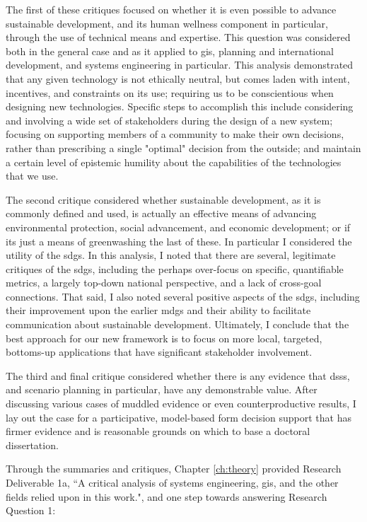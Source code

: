 The first of these critiques focused on whether it is even possible to advance sustainable development, and its human wellness component in particular, through the use of technical means and expertise. This question was considered both in the general case and as it applied to \ac{gis}, planning and international development, and systems engineering in particular. This analysis demonstrated that any given technology is not ethically neutral, but comes laden with intent, incentives, and constraints on its use; requiring us to be conscientious when designing new technologies. Specific steps to accomplish this include considering and involving a wide set of stakeholders during the design of a new system; focusing on supporting members of a community to make their own decisions, rather than prescribing a single "optimal" decision from the outside; and maintain a certain level of epistemic humility about the capabilities of the technologies that we use.

The second critique considered whether sustainable development, as it is commonly defined and used, is actually an effective means of advancing environmental protection, social advancement, and economic development; or if its just a means of greenwashing the last of these. In particular I considered the utility of the \acfp{sdg}. In this analysis, I noted that there are several, legitimate critiques of the \acp{sdg}, including the perhaps over-focus on specific, quantifiable metrics, a largely top-down national perspective, and a lack of cross-goal connections. That said, I also noted several positive aspects of the \acp{sdg}, including their improvement upon the earlier \acfp{mdg} and their ability to facilitate communication about sustainable development. Ultimately, I conclude that the best approach for our new framework is to focus on more local, targeted, bottoms-up applications that have significant stakeholder involvement.

The third and final critique considered whether there is any evidence that \acp{dss}, and scenario planning in particular, have any demonstrable value. After discussing various cases of muddled evidence or even counterproductive results, I lay out the case for a participative, model-based form decision support that has firmer evidence and is reasonable grounds on which to base a doctoral dissertation.

Through the summaries and critiques, Chapter \ref{ch:theory} provided Research Deliverable 1a, ``A critical analysis of systems engineering, \ac{gis}, and the other fields relied upon in this work.", and one step towards answering Research Question 1:

